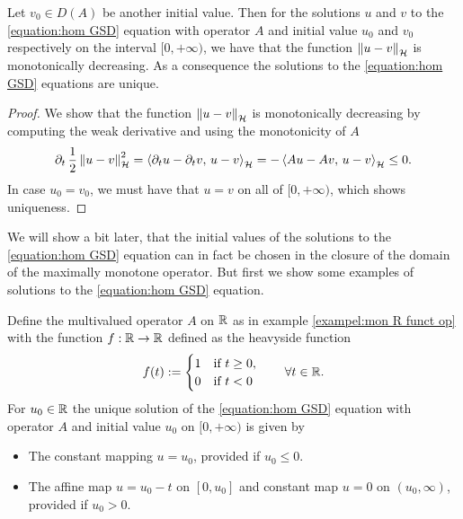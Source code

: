 \begin{corollary}\label{corollary:sol of hgsd are contr}
	Let $ v_0\in D(A) $ be another initial value. Then for the
	solutions $ u$ and $v $ to the \ref{equation:hom GSD} 
	equation with operator $ A $ and initial value $ u_0$ and $v_0 $
	respectively on the interval $ [0,\plus\infty) $, we have that
	the function $ \left\Vert u-v\right\Vert_{\mathcal{H}} $ is monotonically decreasing.
	As a consequence the solutions to the \ref{equation:hom GSD} 
	equations are unique.
\end{corollary}
\begin{proof}
	We show that the function $ \left\Vert u-v\right\Vert_{\mathcal{H}} $ is 
	monotonically decreasing by computing the weak derivative
	and using the monotonicity of $ A $
	\begin{align*}
		\partial_t\, \frac{1}{2}\left\Vert u-v\right\Vert_{\mathcal{H}}^2
		=\left\langle \partial_t u- \partial_t v,\,u-v\right\rangle_{\mathcal{H}}
		=-\left\langle A u- A v,\,u-v\right\rangle_{\mathcal{H}}
		\leq 0.
	\end{align*}
	In case $ u_0=v_0 $, we must have that
	$ u=v $ on all of $ [0,\plus\infty) $, which shows
	uniqueness.
\end{proof}

We will show a bit later, that the initial values
of the solutions to the 
\ref{equation:hom GSD} equation can in fact 
be chosen in the closure
of the domain of the maximally monotone operator.
But first we show some examples of solutions
to the \ref{equation:hom GSD} equation.

\begin{example}
	Define the multivalued operator $ A $ on $ \mathbb{R} $ as
	in example \ref{exampel:mon R funct op} with the
	function $ f:\mathbb{R}\rightarrow\mathbb{R} $ defined as the heavyside function
	\begin{align*}
		f(t):=\begin{cases}
			1 & \text{if } t \geq 0,\\
			0 & \text{if } t < 0
		\end{cases}
		\qquad \forall t\in\mathbb{R}.
	\end{align*}
	For $ u_0\in\mathbb{R} $ the unique solution of the \ref{equation:hom GSD}
	equation with operator $ A $ and initial value $ u_0 $ on $ [0,\plus\infty) $
	is given by
	\begin{itemize}
		\item The constant mapping $ u=u_0 $, provided if $ u_0\leq 0 $.
		\item The affine map $ u=u_0-t $ on $ [0, u_0] $
		and constant map $ u=0 $ on $ (u_0,\infty) $, provided if $ u_0>0 $.
	\end{itemize}
\end{example}

